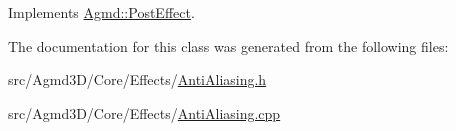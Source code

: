 Implements \hyperlink{class_agmd_1_1_post_effect_a7fa3e1ad3a588dce0f9f51db8b420c91}{Agmd\+::\+Post\+Effect}.



The documentation for this class was generated from the following files\+:\begin{DoxyCompactItemize}
\item 
src/\+Agmd3\+D/\+Core/\+Effects/\hyperlink{_anti_aliasing_8h}{Anti\+Aliasing.\+h}\item 
src/\+Agmd3\+D/\+Core/\+Effects/\hyperlink{_anti_aliasing_8cpp}{Anti\+Aliasing.\+cpp}\end{DoxyCompactItemize}
